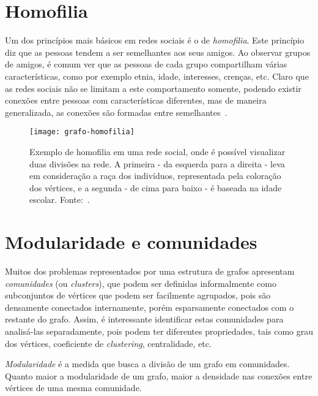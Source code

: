 \section{Homofilia}
\label{conceitos__homofilia}

Um dos princípios mais básicos em redes sociais é o de \emph{homofilia}. Este princípio diz que as pessoas tendem a ser semelhantes aos seus amigos. Ao observar grupos de amigos, é comum ver que as pessoas de cada grupo compartilham várias características, como por exemplo etnia, idade, interesses, crenças, etc. Claro que as redes sociais não se limitam a este comportamento somente, podendo existir conexões entre pessoas com características diferentes, mas de maneira generalizada, as conexões são formadas entre semelhantes~\cite{easley2010networks}.

\begin{figure}[H]
\texttt{[image: grafo-homofilia]}
\centering
\caption{
     Exemplo de homofilia em uma rede social, onde é possível visualizar duas divisões na rede. A primeira - da esquerda para a direita - leva em consideração a raça dos indivíduos, representada pela coloração dos vértices, e a segunda - de cima para baixo - é baseada na idade escolar. Fonte:~\cite{moody2001race}.
}
\label{fig:grafo-homofilia}
\end{figure}

\section{Modularidade e comunidades}
\label{conceitos__modularidade}

Muitos dos problemas representados por uma estrutura de grafos apresentam \emph{comunidades} (ou \emph{clusters}), que podem ser definidas informalmente como subconjuntos de vértices que podem ser facilmente agrupados, pois são densamente conectados internamente, porém esparsamente conectados com o restante do grafo. Assim, é interessante identificar estas comunidades para analisá-las separadamente, pois podem ter diferentes propriedades, tais como grau dos vértices, coeficiente de \emph{clustering}, centralidade, etc.

\emph{Modularidade} é a medida que busca a divisão de um grafo em comunidades. Quanto maior a modularidade de um grafo, maior a densidade nas conexões entre vértices de uma mesma comunidade.

